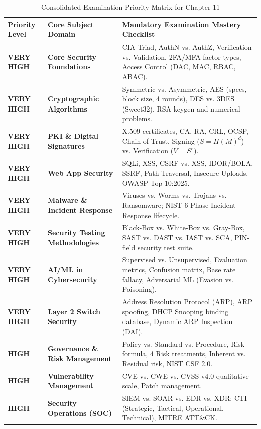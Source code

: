 \begin{table}[htbp]
\centering
\caption{Consolidated Examination Priority Matrix for Chapter 11}
\label{tab:high_priority_matrix}
\begin{tabularx}{\textwidth}{l p{4.2cm} X}
\toprule
\textbf{Priority Level} & \textbf{Core Subject Domain} & \textbf{Mandatory Examination Mastery Checklist} \\
\midrule
\textbf{VERY HIGH} & \textbf{Core Security Foundations} & CIA Triad, AuthN vs. AuthZ, Verification vs. Validation, 2FA/MFA factor types, Access Control (DAC, MAC, RBAC, ABAC). \\
\textbf{VERY HIGH} & \textbf{Cryptographic Algorithms} & Symmetric vs. Asymmetric, AES (specs, block size, 4 rounds), DES vs. 3DES (Sweet32), RSA keygen and numerical problems. \\
\textbf{VERY HIGH} & \textbf{PKI \& Digital Signatures} & X.509 certificates, CA, RA, CRL, OCSP, Chain of Trust, Signing ($S=H(M)^d$) vs. Verification ($V=S^e$). \\
\textbf{VERY HIGH} & \textbf{Web App Security} & SQLi, XSS, CSRF vs. XSS, IDOR/BOLA, SSRF, Path Traversal, Insecure Uploads, OWASP Top 10:2025. \\
\textbf{VERY HIGH} & \textbf{Malware \& Incident Response} & Viruses vs. Worms vs. Trojans vs. Ransomware; NIST 6-Phase Incident Response lifecycle. \\
\textbf{VERY HIGH} & \textbf{Security Testing Methodologies} & Black-Box vs. White-Box vs. Gray-Box, SAST vs. DAST vs. IAST vs. SCA, PIN-field security test suite. \\
\textbf{VERY HIGH} & \textbf{AI/ML in Cybersecurity} & Supervised vs. Unsupervised, Evaluation metrics, Confusion matrix, Base rate fallacy, Adversarial ML (Evasion vs. Poisoning). \\
\textbf{VERY HIGH} & \textbf{Layer 2 Switch Security} & Address Resolution Protocol (ARP), ARP spoofing, DHCP Snooping binding database, Dynamic ARP Inspection (DAI). \\
\textbf{HIGH} & \textbf{Governance \& Risk Management} & Policy vs. Standard vs. Procedure, Risk formula, 4 Risk treatments, Inherent vs. Residual risk, NIST CSF 2.0. \\
\textbf{HIGH} & \textbf{Vulnerability Management} & CVE vs. CWE vs. CVSS v4.0 qualitative scale, Patch management. \\
\textbf{HIGH} & \textbf{Security Operations (SOC)} & SIEM vs. SOAR vs. EDR vs. XDR; CTI (Strategic, Tactical, Operational, Technical), MITRE ATT\&CK. \\

\end{tabularx}
\end{table}
